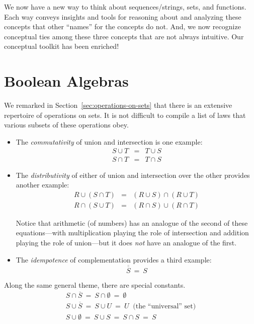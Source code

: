 We now have a new way to think about sequences/strings, sets, and functions.  Each way conveys insights and tools for reasoning about and analyzing these concepts that other ``names'' for the concepts do not.  And, we now recognize conceptual ties among these three concepts that are not always intuitive.  Our conceptual toolkit has been enriched!

\section{Boolean Algebras}
\label{sec:Boolean-Algebra}

We remarked in Section~\ref{sec:operations-on-sets} that there is an extensive repertoire of operations on sets.  It is not difficult to compile a list of laws that various subsets of these operations obey.
\begin{itemize}
\item
The {\em commutativity} of union and intersection is one example:
\begin{eqnarray*}
S \cup T & = & T \cup S \\
S \cap T & = & T \cap S
\end{eqnarray*}

\item
The {\em distributivity} of either of union and intersection over the other provides another example:
\begin{eqnarray*}
R \cup (S \cap T) & = & (R \cup S) \cap (R \cup T) \\
R \cap (S \cup T) & = & (R \cap S) \cup (R \cap T)
\end{eqnarray*}

\smallskip

Notice that arithmetic (of numbers) has an analogue of the second of these equations---with multiplication playing the role of intersection and addition playing the role of union---but it does {\em not} have an analogue of the first.

\item
The {\em idempotence} of complementation provides a third example:
\[ \overline{\overline{S}} \ = \ S \]
\end{itemize}
Along the same general theme, there are special constants.
\[
\begin{array}{l}
S \cap \overline{S} \ = \ S \cap \emptyset \ = \ \emptyset \\
S \cup \overline{S} \ = \ S \cup U \ = \ U \ \mbox{ (the ``universal'' set)} \\
S \cup \emptyset \ = \ S \cup S \ = \ S \cap S \ = \ S \\
\end{array}
\]

